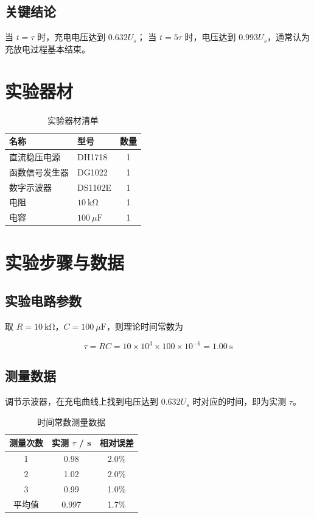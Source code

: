 \documentclass[12pt, a4paper]{ctexart}
\begin{document}
\subsection{关键结论}
当 $t = \tau$ 时，充电电压达到 $0.632 U_s$；
当 $t = 5\tau$ 时，电压达到 $0.993 U_s$，通常认为充放电过程基本结束。

\section{实验器材}
\begin{table}[H]
\centering
\caption{实验器材清单}
\begin{tabular}{@{}llc@{}}
\toprule
名称 & 型号 & 数量 \\
\midrule
直流稳压电源 & DH1718 & 1 \\
函数信号发生器 & DG1022 & 1 \\
数字示波器 & DS1102E & 1 \\
电阻 & $10\ \mathrm{k\Omega}$ & 1 \\
电容 & $100\ \mu\mathrm{F}$ & 1 \\
\bottomrule
\end{tabular}
\end{table}

\section{实验步骤与数据}

\subsection{实验电路参数}
取 $R = 10\ \mathrm{k\Omega}$，$C = 100\ \mu\mathrm{F}$，则理论时间常数为

\begin{equation}
    \tau = RC = 10 \times 10^3 \times 100 \times 10^{-6} = 1.00\ \mathrm{s}
\end{equation}

\subsection{测量数据}
调节示波器，在充电曲线上找到电压达到 $0.632 U_s$ 时对应的时间，即为实测 $\tau$。

\begin{table}[H]
\centering
\caption{时间常数测量数据}
\begin{tabular}{@{}ccc@{}}
\toprule
测量次数 & 实测 $\tau$ / s & 相对误差 \\
\midrule
1 & 0.98 & 2.0\% \\
2 & 1.02 & 2.0\% \\
3 & 0.99 & 1.0\% \\
\midrule
平均值 & 0.997 & 1.7\% \\
\bottomrule
\end{tabular}
\end{table}
\end{document}
